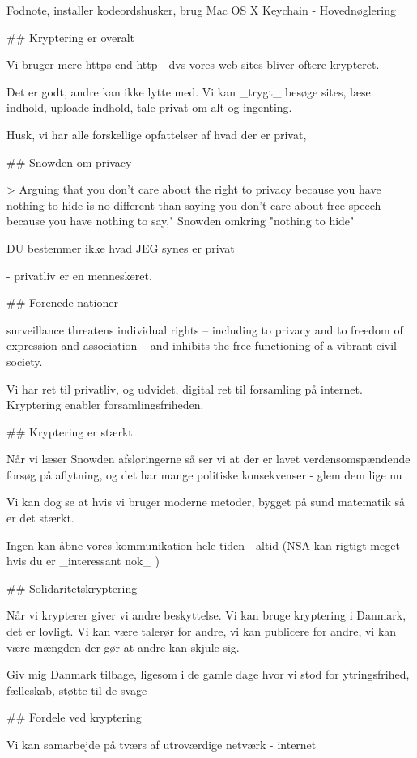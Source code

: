 \documentclass[20pt,landscape,a4paper,footrule]{foils}
\begin{document}
Fodnote, installer kodeordshusker, brug Mac OS X Keychain - Hovednøglering

## Kryptering er overalt

Vi bruger mere https end http - dvs vores web sites bliver oftere krypteret.

Det er godt, andre kan ikke lytte med. Vi kan _trygt_ besøge sites, læse indhold, uploade indhold, tale privat om alt og ingenting.

Husk, vi har alle forskellige opfattelser af hvad der er privat,

## Snowden om privacy

> Arguing that you don't care about the right to privacy because you have nothing to hide is no different than saying you don't care about free speech because you
have nothing to say," Snowden omkring "nothing to hide"

DU bestemmer ikke hvad JEG synes er privat

- privatliv er en menneskeret.


## Forenede nationer

 surveillance threatens individual rights – including to privacy and to freedom of expression and association – and inhibits the free functioning of a vibrant civil society.

Vi har ret til privatliv, og udvidet, digital ret til forsamling på internet. Kryptering enabler forsamlingsfriheden.


## Kryptering er stærkt

Når vi læser Snowden afsløringerne så ser vi at der er lavet verdensomspændende forsøg på aflytning, og det har mange politiske konsekvenser - glem dem lige nu

Vi kan dog se at hvis vi bruger moderne metoder, bygget på sund matematik så er det stærkt.

Ingen kan åbne vores kommunikation hele tiden - altid
(NSA kan rigtigt meget hvis du er _interessant nok_ )

## Solidaritetskryptering

Når vi krypterer giver vi andre beskyttelse. Vi kan bruge kryptering i Danmark, det er lovligt. Vi kan være talerør for andre, vi kan publicere for andre, vi kan være mængden der gør at andre kan skjule sig.

Giv mig Danmark tilbage, ligesom i de gamle dage
hvor vi stod for ytringsfrihed, fælleskab, støtte til de svage


## Fordele ved kryptering

Vi kan samarbejde på tværs af utroværdige netværk - internet
\end{document}
